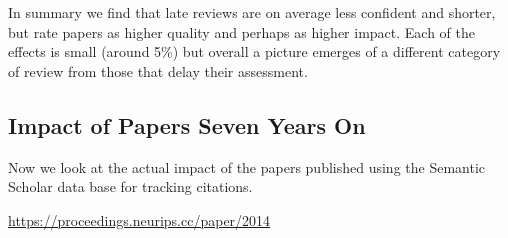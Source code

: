 In summary we find that late reviews are on average less confident and
shorter, but rate papers as higher quality and perhaps as higher impact.
Each of the effects is small (around 5\%) but overall a picture emerges
of a different category of review from those that delay their
assessment.

\hypertarget{impact-of-papers-seven-years-on}{%
\subsection{Impact of Papers Seven Years
On}\label{impact-of-papers-seven-years-on}}

\begin{flushright}
\end{flushright}

Now we look at the actual impact of the papers published using the
Semantic Scholar data base for tracking citations.

\begin{Shaded}
\begin{Highlighting}[]
\end{Highlighting}
\end{Shaded}

\begin{Shaded}
\begin{Highlighting}[]
\end{Highlighting}
\end{Shaded}

\begin{Shaded}
\begin{Highlighting}[]
\OperatorTok{=}
\end{Highlighting}
\end{Shaded}

\url{https://proceedings.neurips.cc/paper/2014}

\begin{Shaded}
\begin{Highlighting}[]
\OperatorTok{=}  
\end{Highlighting}
\end{Shaded}

